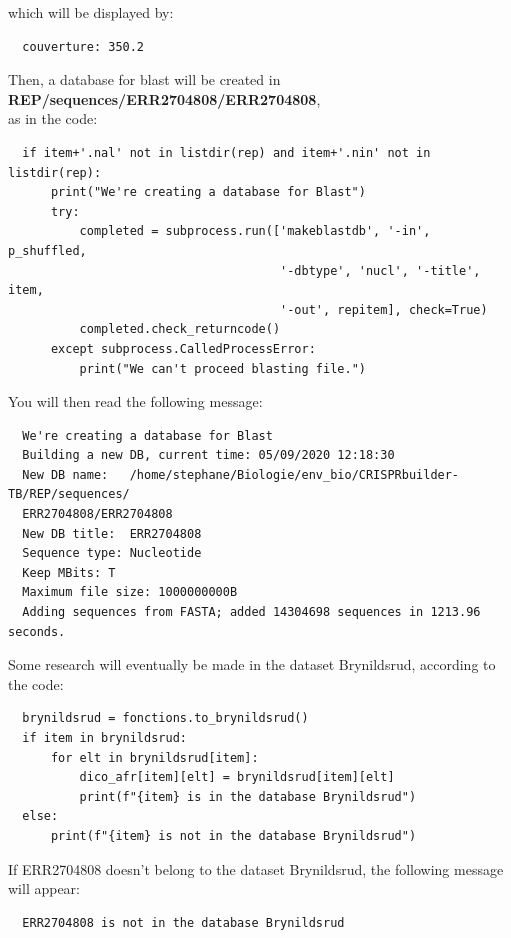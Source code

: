 \documentclass[twoside,a4paper,11pt,frenchb,openany]{report}
\begin{document}
    which will be displayed by:

    \begin{verbatim}
  couverture: 350.2        
\end{verbatim}

    Then, a database for blast will be created in
\textbf{REP/sequences/ERR2704808/ERR2704808}, \\as in the code:

\begin{verbatim}
  if item+'.nal' not in listdir(rep) and item+'.nin' not in listdir(rep):
      print("We're creating a database for Blast")
      try:
          completed = subprocess.run(['makeblastdb', '-in', p_shuffled,
                                      '-dbtype', 'nucl', '-title', item,
                                      '-out', repitem], check=True)
          completed.check_returncode()
      except subprocess.CalledProcessError:
          print("We can't proceed blasting file.")
\end{verbatim}

    You will then read the following message:

    \begin{verbatim}
  We're creating a database for Blast
  Building a new DB, current time: 05/09/2020 12:18:30
  New DB name:   /home/stephane/Biologie/env_bio/CRISPRbuilder-TB/REP/sequences/
  ERR2704808/ERR2704808
  New DB title:  ERR2704808
  Sequence type: Nucleotide
  Keep MBits: T
  Maximum file size: 1000000000B
  Adding sequences from FASTA; added 14304698 sequences in 1213.96 seconds.
\end{verbatim}

    Some research will eventually be made in the dataset Brynildsrud,
according to the code:

\begin{verbatim}
  brynildsrud = fonctions.to_brynildsrud()
  if item in brynildsrud:
      for elt in brynildsrud[item]:
          dico_afr[item][elt] = brynildsrud[item][elt]
          print(f"{item} is in the database Brynildsrud")
  else:
      print(f"{item} is not in the database Brynildsrud")
\end{verbatim}

    If ERR2704808 doesn't belong to the dataset Brynildsrud, the following
message will appear:

    \begin{verbatim}
  ERR2704808 is not in the database Brynildsrud
\end{verbatim}
\end{document}
